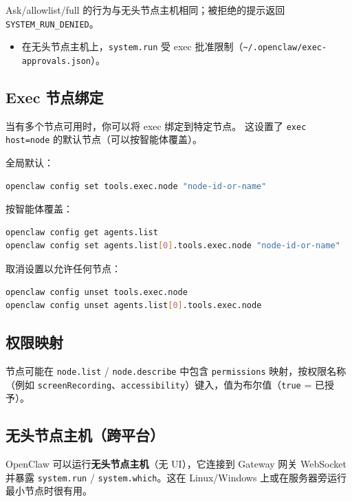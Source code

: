 Ask/allowlist/full 的行为与无头节点主机相同；被拒绝的提示返回 \texttt{SYSTEM\_RUN\_DENIED}。
\begin{itemize}
  \item 在无头节点主机上，\texttt{system.run} 受 exec 批准限制（\texttt{\textasciitilde{}/.openclaw/exec-approvals.json}）。
\end{itemize}


\subsection{Exec 节点绑定}


当有多个节点可用时，你可以将 exec 绑定到特定节点。
这设置了 \texttt{exec host=node} 的默认节点（可以按智能体覆盖）。

全局默认：

\begin{lstlisting}[language=bash]
openclaw config set tools.exec.node "node-id-or-name"
\end{lstlisting}


按智能体覆盖：

\begin{lstlisting}[language=bash]
openclaw config get agents.list
openclaw config set agents.list[0].tools.exec.node "node-id-or-name"
\end{lstlisting}


取消设置以允许任何节点：

\begin{lstlisting}[language=bash]
openclaw config unset tools.exec.node
openclaw config unset agents.list[0].tools.exec.node
\end{lstlisting}


\subsection{权限映射}


节点可能在 \texttt{node.list} / \texttt{node.describe} 中包含 \texttt{permissions} 映射，按权限名称（例如 \texttt{screenRecording}、\texttt{accessibility}）键入，值为布尔值（\texttt{true} = 已授予）。

\subsection{无头节点主机（跨平台）}


OpenClaw 可以运行\textbf{无头节点主机}（无 UI），它连接到 Gateway 网关
WebSocket 并暴露 \texttt{system.run} / \texttt{system.which}。这在 Linux/Windows
上或在服务器旁运行最小节点时很有用。


